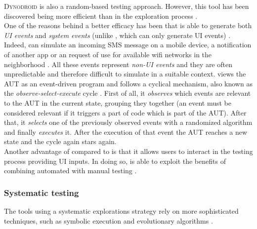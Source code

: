 \textsc{Dynodroid} \cite{dynodroid} is also a random-based testing approach. However, this tool has been discovered being more efficient than \monkey in the exploration process  \cite{areWeThereYet}. \\
One of the reasons behind a better efficacy has been that \dynodroid is able to generate both \textit{UI events} and \textit{system events} (unlike \monkey, which can only generate UI events) \cite{areWeThereYet}. \\  
Indeed, \dynodroid can simulate an incoming SMS message on a mobile device, a notification of another app or an request of use for available wifi networks in the neighborhood \cite{dynodroid}. All these events represent \textit{non-UI events} and they are often unpredictable and therefore difficult to simulate in a suitable context. 
\dynodroid views the AUT as an event-driven program and follows a cyclical mechanism, also known as the \textit{observe-select-execute} cycle \cite{dynodroid}. First of all, it \textit{observes} which events are relevant to the AUT in the current state, grouping they together (an event must be considered relevant if it triggers a part of code which is part of the AUT). After that, it \textit{selects} one of the previously observed events with a randomized algorithm \cite{dynodroid, areWeThereYet} and finally \textit{executes} it. After the execution of that event the AUT reaches a new state and the cycle again stars again. \\
Another advantage of \dynodroid compared to \monkey is that it allows users to interact in the testing process providing UI inputs. In doing so, \dynodroid is able to exploit the benefits of combining automated with manual testing \cite{dynodroid}.

\subsubsection{Systematic testing}
The tools using a systematic explorations strategy rely on more sophisticated techniques, such as symbolic execution and evolutionary algorithms \cite{areWeThereYet}. 


